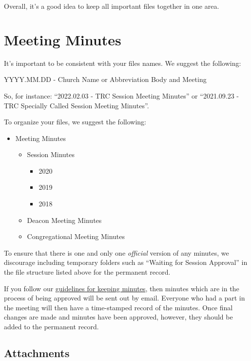 \documentclass[
]{book}
\providecommand{\tightlist}{%
  \setlength{\itemsep}{0pt}\setlength{\parskip}{0pt}}
\begin{document}
Overall, it's a good idea to keep all important files together in one area.

\hypertarget{meeting-minutes}{%
\section{Meeting Minutes}\label{meeting-minutes}}

It's important to be consistent with your files names. We suggest the following:

YYYY.MM.DD - Church Name or Abbreviation \textbar{} Body and Meeting

So, for instance: ``2022.02.03 - TRC Session Meeting Minutes'' or ``2021.09.23 - TRC Specially Called Session Meeting Minutes''.

To organize your files, we suggest the following:

\begin{itemize}
\tightlist
\item
  Meeting Minutes

  \begin{itemize}
  \tightlist
  \item
    Session Minutes

    \begin{itemize}
    \tightlist
    \item
      2020
    \item
      2019
    \item
      2018
    \end{itemize}
  \item
    Deacon Meeting Minutes
  \item
    Congregational Meeting Minutes
  \end{itemize}
\end{itemize}

To ensure that there is one and only one \emph{official} version of any minutes, we discourage including temporary folders such as ``Waiting for Session Approval'' in the file structure listed above for the permanent record.

If you follow our \href{keeping-minutes.html}{guidelines for keeping minutes}, then minutes which are in the process of being approved will be sent out by email. Everyone who had a part in the meeting will then have a time-stamped record of the minutes. Once final changes are made and minutes have been approved, however, they should be added to the permanent record.

\hypertarget{attachments}{%
\subsection{Attachments}\label{attachments}}
\end{document}
